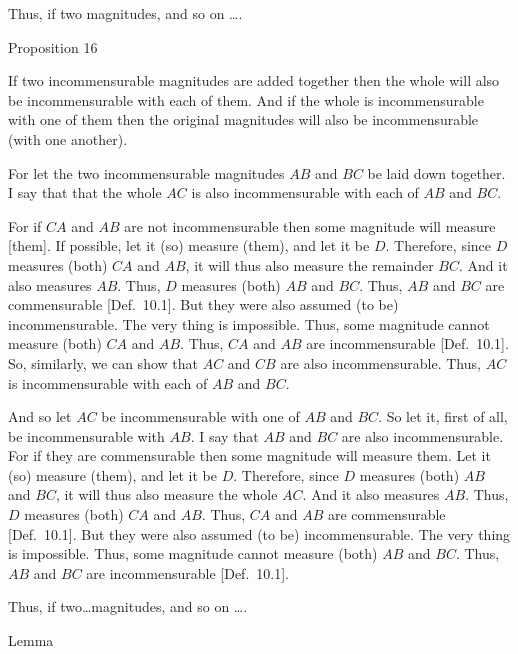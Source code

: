 Thus, if two magnitudes, and so on \ldots.


\begin{center}
{\large Proposition 16}
\end{center}

If two incommensurable magnitudes are
added together then the whole will also be incommensurable with
each of them. And if the whole is incommensurable with one of them then
the original magnitudes will also be incommensurable (with one another).

\epsfysize=0.6in
\centerline{}

For let the two incommensurable magnitudes $AB$ and $BC$ be
laid down together. I say that that the whole $AC$ is also
incommensurable with each of $AB$ and $BC$.

For if $CA$ and $AB$ are not incommensurable then some magnitude
will measure [them]. If possible, let it (so) measure (them), and let it
be $D$. Therefore, since $D$ measures (both) $CA$ and $AB$, it will
thus also measure the remainder $BC$. And it also measures $AB$.
Thus, $D$ measures (both) $AB$ and $BC$. Thus, $AB$ and $BC$ are
commensurable [Def.~10.1]. But they were also assumed (to be) incommensurable.
The very thing is impossible. Thus, some magnitude cannot
measure (both) $CA$ and $AB$. Thus, $CA$ and $AB$ are incommensurable [Def.~10.1]. So, similarly, we can show that $AC$ and
$CB$ are also incommensurable. Thus, $AC$ is incommensurable with each
of $AB$ and $BC$.

And so let $AC$ be incommensurable with one of $AB$ and $BC$. So
let it, first of all, be incommensurable with $AB$. I say that $AB$ and
$BC$ are also incommensurable. For if they are commensurable then
some magnitude will measure them. Let it (so) measure (them), and let it
be $D$. Therefore, since $D$ measures (both) $AB$ and $BC$, 
it will thus also measure the whole  $AC$. And it also measures $AB$. 
Thus, $D$ measures (both) $CA$ and $AB$. Thus, $CA$ and $AB$
are commensurable  [Def.~10.1]. But they
were also assumed (to be) incommensurable. The very thing is
impossible. Thus, some magnitude cannot measure (both) $AB$ and
$BC$. Thus, $AB$ and $BC$ are incommensurable  [Def.~10.1].

Thus, if two\ldots magnitudes, and so on \ldots.


\begin{center}
{\large Lemma}
\end{center}

